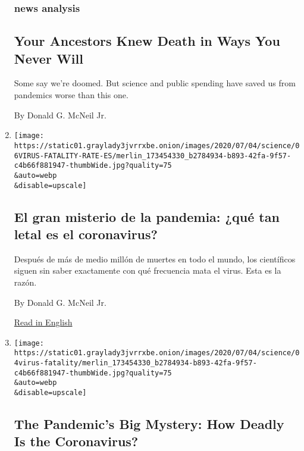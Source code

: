 \begin{enumerate}
{  \subsubsection{news analysis}\label{news-analysis}}

  \hypertarget{your-ancestors-knew-death-in-ways-you-never-will}{%
  \subsection{Your Ancestors Knew Death in Ways You Never
  Will}\label{your-ancestors-knew-death-in-ways-you-never-will}}

  Some say we're doomed. But science and public spending have saved us
  from pandemics worse than this one.

  By Donald G. McNeil Jr.
\item
  \href{/es/2020/07/06/espanol/tasa-mortalidad-fatalidad-coronavirus.html}{}

  \texttt{[image: https://static01.graylady3jvrrxbe.onion/images/2020/07/04/science/06VIRUS-FATALITY-RATE-ES/merlin\_173454330\_b2784934-b893-42fa-9f57-c4b66f881947-thumbWide.jpg?quality=75\\\&auto=webp\\\&disable=upscale]}

  \hypertarget{el-gran-misterio-de-la-pandemia-quuxe9-tan-letal-es-el-coronavirus}{%
  \subsection{El gran misterio de la pandemia: ¿qué tan letal es el
  coronavirus?}\label{el-gran-misterio-de-la-pandemia-quuxe9-tan-letal-es-el-coronavirus}}

  Después de más de medio millón de muertes en todo el mundo, los
  científicos siguen sin saber exactamente con qué frecuencia mata el
  virus. Esta es la razón.

  By Donald G. McNeil Jr.

  \href{https://www.nytimes3xbfgragh.onion/2020/07/04/health/coronavirus-death-rate.html}{Read
  in English}
\item
  \href{/2020/07/04/health/coronavirus-death-rate.html}{}

  \texttt{[image: https://static01.graylady3jvrrxbe.onion/images/2020/07/04/science/04virus-fatality/merlin\_173454330\_b2784934-b893-42fa-9f57-c4b66f881947-thumbWide.jpg?quality=75\\\&auto=webp\\\&disable=upscale]}

  \hypertarget{the-pandemics-big-mystery-how-deadly-is-the-coronavirus}{%
  \subsection{The Pandemic's Big Mystery: How Deadly Is the
  Coronavirus?}\label{the-pandemics-big-mystery-how-deadly-is-the-coronavirus}}


\end{enumerate}
